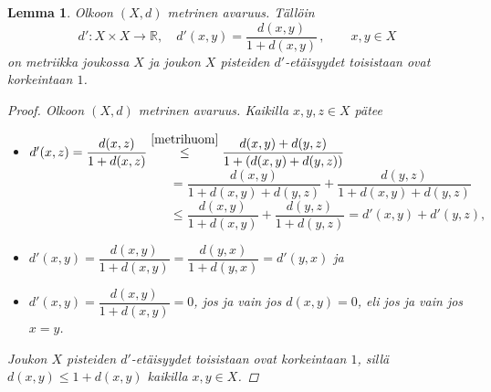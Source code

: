 \documentclass[12pt,a4paper,leqno]{report}
\newcommand{\R}{\mathbb{R}}
\theoremstyle{plain}
\newtheorem{lem}[equation]{Lemma}
\theoremstyle{definition}
\theoremstyle{remark}
\begin{document}
\begin{lem}\label{rajmetri} Olkoon $(X,d)$ metrinen avaruus. Tällöin
$$d'\colon X\times X \rightarrow \R,\quad d'(x,y)=\dfrac{d(x,y)}{1+d(x,y)} \, , \qquad x,y\in X$$
on metriikka joukossa $X$ ja joukon $X$ pisteiden $d'$-etäisyydet toisistaan ovat korkeintaan $1$.
\begin{proof}
Olkoon $(X,d)$ metrinen avaruus. 
Kaikilla $x,y,z\in X$ pätee
\begin{itemize}
\item[(M1)]$d'(x,z)=\dfrac{d(x,z)}{1+d(x,z)}
\overset{\ref{metrihuom}}{\leq} \dfrac{d(x,y)+d(y,z)}{1+(d(x,y)+d(y,z))}$\\
$\phantom{d'(x,z)=\dfrac{d(x,z)}{1+d(x,z)}}
= \dfrac{d(x,y)}{1+d(x,y)+d(y,z)}+ \dfrac{d(y,z)}{1+d(x,y)+d(y,z)}$\\
$\phantom{d'(x,z)=\dfrac{d(x,z)}{1+d(x,z)}}
\leq \dfrac{d(x,y)}{1+d(x,y)}+ \dfrac{d(y,z)}{1+d(y,z)}=d'(x,y)+d'(y,z),$\\
\item[(M2)]$d'(x,y)=\dfrac{d(x,y)}{1+d(x,y)}
=\dfrac{d(y,x)}{1+d(y,x)}=d'(y,x)$ ja
\item[(M3)]$d'(x,y)=\dfrac{d(x,y)}{1+d(x,y)}=0$, jos ja vain jos $d(x,y)=0$, eli jos ja vain jos $x=y$.
\end{itemize} 
Joukon $X$ pisteiden $d'$-etäisyydet toisistaan ovat korkeintaan $1$, sillä $d(x,y)\leq 1+d(x,y)$ kaikilla $x,y\in X$.
\end{proof}
\end{lem}
\end{document}
